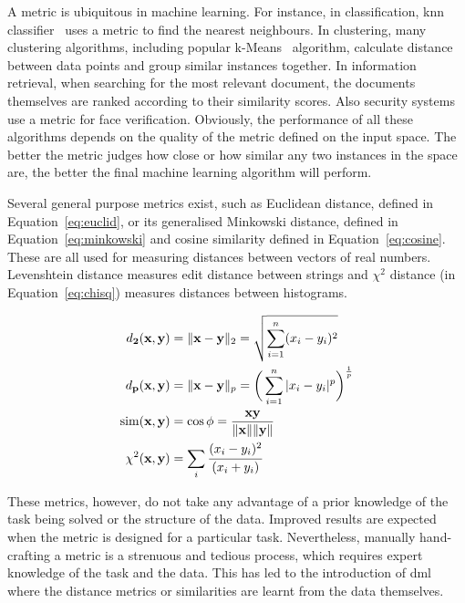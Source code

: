 

A metric is ubiquitous in machine learning. For instance, in classification, \ac{knn} classifier~\citep{cover1967nearest} uses a metric to find the nearest neighbours. In clustering, many clustering algorithms, including popular k-Means~\citep{hartigan1979algorithm} algorithm, calculate distance between data points and group similar instances together. In information retrieval, when searching for the most relevant document, the documents themselves are ranked according to their similarity scores. Also security systems use a metric for face verification. Obviously, the performance of all these algorithms depends on the quality of the metric defined on the input space. The better the metric judges how close or how similar any two instances in the space are, the better the final machine learning algorithm will perform.

Several general purpose metrics exist, such as Euclidean distance, defined in Equation~\ref{eq:euclid}, or its generalised Minkowski distance, defined in Equation~\ref{eq:minkowski} and cosine similarity defined in Equation~\ref{eq:cosine}. These are all used for measuring distances between vectors of real numbers. Levenshtein distance measures edit distance between strings and $\chi^2$ distance (in Equation~\ref{eq:chisq}) measures distances between histograms.

\begin{align}
d_{\mathbf{2}}(\textbf{x}, \textbf{y}) &= \|\textbf{x}-\textbf{y}\|_2 = \sqrt{\sum_{i=1}^{n} (x_i-y_i)^2} \label{eq:euclid} \\
d_{\mathbf{p}}(\textbf{x}, \textbf{y}) &= \|\textbf{x}-\textbf{y}\|_p = \bigg(\sum_{i=1}^{n} |x_i-y_i|^p\bigg)^\frac{1}{p} \label{eq:minkowski} \\
\mathrm{sim}(\textbf{x}, \textbf{y}) &= \cos{\phi} = \frac{\textbf{x}\textbf{y}}{\|\textbf{x}\|\|\textbf{y}\|} \label{eq:cosine} \\
\chi^2(\textbf{x}, \textbf{y}) &= \sum_{i} \cfrac{(x_i - y_i)^2} {(x_i + y_i)} \label{eq:chisq}
\end{align}

These metrics, however, do not take any advantage of a prior knowledge of the task being solved or the structure of the data. Improved results are expected when the metric is designed for a particular task. Nevertheless, manually hand-crafting a metric is a strenuous and tedious process, which requires expert knowledge of the task and the data. This has led to the introduction of \ac{dml} where the distance metrics or similarities are learnt from the data themselves.

